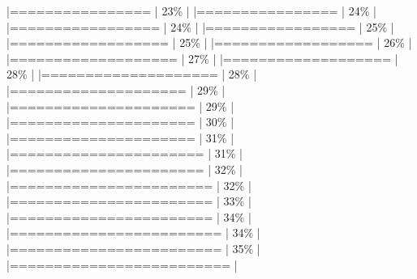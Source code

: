 \documentclass[
]{article}
\newenvironment{Shaded}{}{}
\begin{document}
\begin{Shaded}
\begin{Highlighting}[]
                                         |================                                                      |  23\%  |                                                                              |================                                                      |  24\%  |                                                                              |=================                                                     |  24\%  |                                                                              |=================                                                     |  25\%  |                                                                              |==================                                                    |  25\%  |                                                                              |==================                                                    |  26\%  |                                                                              |===================                                                   |  27\%  |                                                                              |===================                                                   |  28\%  |                                                                              |====================                                                  |  28\%  |                                                                              |====================                                                  |  29\%  |                                                                              |=====================                                                 |  29\%  |                                                                              |=====================                                                 |  30\%  |                                                                              |=====================                                                 |  31\%  |                                                                              |======================                                                |  31\%  |                                                                              |======================                                                |  32\%  |                                                                              |=======================                                               |  32\%  |                                                                              |=======================                                               |  33\%  |                                                                              |=======================                                               |  34\%  |                                                                              |========================                                              |  34\%  |                                                                              |========================                                              |  35\%  |                                                                              |=========================                                             |  
\end{Highlighting}
\end{Shaded}
\end{document}
